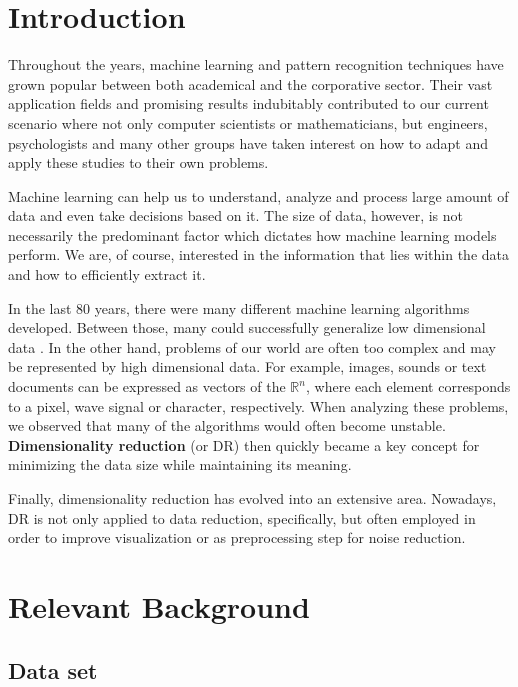 \documentclass[12pt]{article}
\begin{document}
\newpage

\section{Introduction}

Throughout the years, machine learning and pattern recognition techniques have grown popular between both academical and the corporative sector. Their vast application fields and promising results indubitably contributed to our current scenario where not only computer scientists or mathematicians, but engineers, psychologists and many other groups have taken interest on how to adapt and apply these studies to their own problems.

Machine learning can help us to understand, analyze and process large amount of data and even take decisions based on it. The size of data, however, is not necessarily the predominant factor which dictates how machine learning models perform. We are, of course, interested in the information that lies within the data and how to efficiently extract it.

In the last 80 years, there were many different machine learning algorithms developed. Between those, many could successfully generalize low dimensional data \cite{wang2012geometric}. In the other hand, problems of our world are often too complex and may be represented by high dimensional data. For example, images, sounds or text documents can be expressed as vectors of the $\mathbb{R}^n$, where each element corresponds to a pixel, wave signal or character, respectively. When analyzing these problems, we observed that many of the algorithms would often become unstable. \textbf{Dimensionality reduction} (or DR) then quickly became a key concept for minimizing the data size while maintaining its meaning.

Finally, dimensionality reduction has evolved into an extensive area. Nowadays, DR is not only applied to data reduction, specifically, but often employed in order to improve visualization or as preprocessing step for noise reduction.

\newpage

\section{Relevant Background}
\subsection{Data set}
\end{document}
